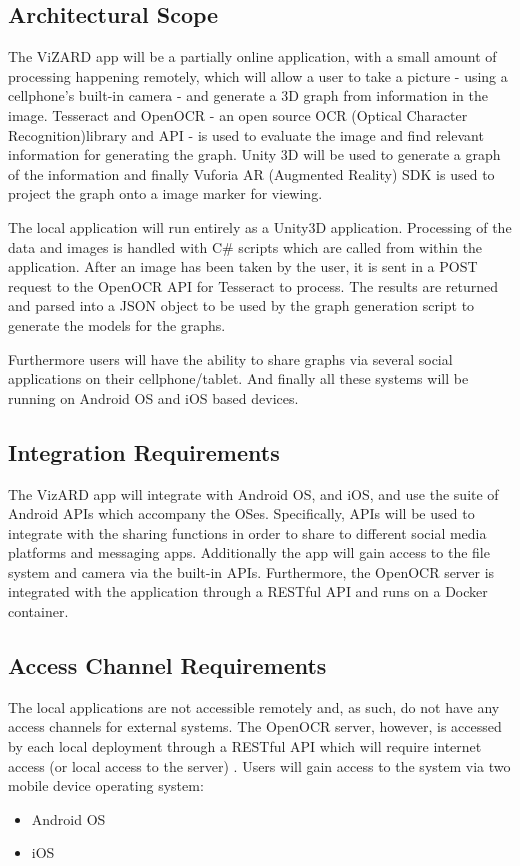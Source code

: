 \documentclass[a4paper,12pt]{article}
\begin{document}
\subsection{Architectural Scope}
The ViZARD app will be a partially online application, with a small amount of processing happening remotely, which will allow a user to take a picture - using a cellphone's built-in camera - and generate a 3D graph from information in the image. Tesseract and OpenOCR - an open source OCR (Optical Character Recognition)library and API - is used to evaluate the image and find relevant information for generating the graph. 
Unity 3D will be used to generate a graph of the information and finally Vuforia AR (Augmented Reality) SDK is used to project the graph onto a image marker for viewing.

The local application will run entirely as a Unity3D application. Processing of the data and images is handled with C\# scripts which are called from within the application. After an image has been taken by the user, it is sent in a POST request to the OpenOCR API for Tesseract to process. The results are returned and parsed into a JSON object to be used by the graph generation script to generate the models for the graphs.

Furthermore users will have the ability to share graphs via several social applications on their cellphone/tablet.
And finally all these systems will be running on Android OS and iOS based devices.

\subsection{Integration Requirements}
The VizARD app will integrate with Android OS, and iOS, and use the suite of Android APIs which accompany the OSes. Specifically, APIs will be used to integrate with the sharing functions in order to share to different social media platforms and messaging apps. Additionally the app will gain access to the file system and camera via the built-in APIs. Furthermore, the OpenOCR server is integrated with the application through a RESTful API and runs on a Docker container.

\subsection{Access Channel Requirements}
The local applications are not accessible remotely and, as such, do not have any access channels for external systems. The OpenOCR server, however, is accessed by each local deployment through a RESTful API which will require internet access (or local access to the server)
.
Users will gain access to the system via two mobile device operating system:
\begin{itemize}
	\item Android OS
	\item iOS
\end{itemize}
\end{document}
